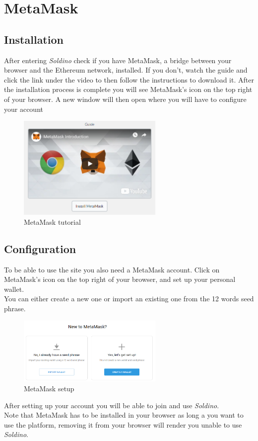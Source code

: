 \section{MetaMask}
	\subsection{Installation}
	After entering \textit{Soldino} check if you have MetaMask, a bridge between 
	your browser and the Ethereum network, installed.
	If you don't, watch the guide and click the link under the video to then 
	follow the instructions to download it. After the installation process is 
	complete you will see MetaMask's icon on the top right of your browser. A 
	new window will then open where you will have to configure your account\newline
	\begin{figure}[H]
		\includegraphics[width=7cm]{res/images/MetaMask_download.png}
		\centering
		\caption{MetaMask tutorial}
	\end{figure}
	\subsection{Configuration}
	To be able to use the site you also need a MetaMask account. Click on 
	MetaMask's icon on the top right of your browser, and set up your 
	personal wallet.\\
	You can either create a new one or import an existing one from the 12 
	words seed phrase.
	\begin{figure}[H]
		\includegraphics[width=7cm]{res/images/metamask_select.png}
		\centering
		\caption{MetaMask setup}
	\end{figure}
	\noindent After setting up your account you will be able to join and use 
	\textit{Soldino}.
	\newline \\
	Note that MetaMask has to be installed in your browser as long a you want 
	to use the platform, removing it from your browser will render you unable to
	use \textit{Soldino}.
